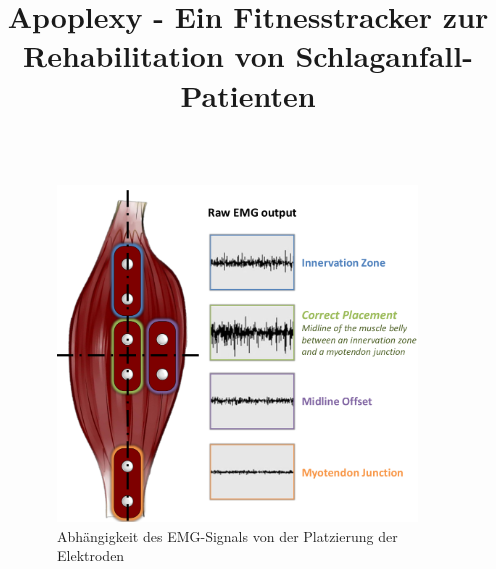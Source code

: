 \documentclass[final,20pt]{beamer}
\title{Apoplexy - Ein Fitnesstracker zur Rehabilitation von Schlaganfall-Patienten}
\newlength{\sepwidth}
\newlength{\colwidth}
\newcommand{\separatorcolumn}{\begin{column}{\sepwidth}\end{column}}
\begin{document}
\begin{frame}[t]

\begin{columns}[t]
\separatorcolumn

\begin{column}{\colwidth}
   \begin{figure}
   	\centering \includegraphics[width=\colwidth]{emg-output.png}
   	\caption{Abhängigkeit des EMG-Signals von der Platzierung der Elektroden}
   \end{figure}
\end{column}

\separatorcolumn
\begin{column}{\colwidth}  
	

\end{column}
\end{columns}
\end{frame}
\end{document}
